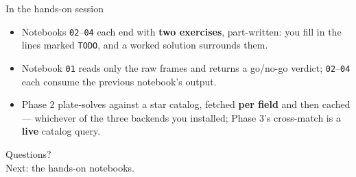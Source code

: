 \documentclass[10pt,aspectratio=169]{beamer}
\begin{document}
\begin{frame}{In the hands-on session}
  \centering

  \vspace{1.0em}
  \begin{itemize}\footnotesize
    \item Notebooks \texttt{02}--\texttt{04} each end with \textbf{two exercises}, part-written:
          you fill in the lines marked \texttt{TODO}, and a worked solution surrounds them.
    \item Notebook \texttt{01} reads only the raw frames and returns a go/no-go verdict;
          \texttt{02}--\texttt{04} each consume the previous notebook's output.
    \item Phase 2 plate-solves against a star catalog, fetched \textbf{per field} and then
          cached --- whichever of the three backends you installed;
          Phase 3's cross-match is a \textbf{live} catalog query.
  \end{itemize}
\end{frame}

\begin{frame}
  \centering
  \Large Questions?\\[0.5em]
  \normalsize Next: the hands-on notebooks.
\end{frame}
\end{document}
